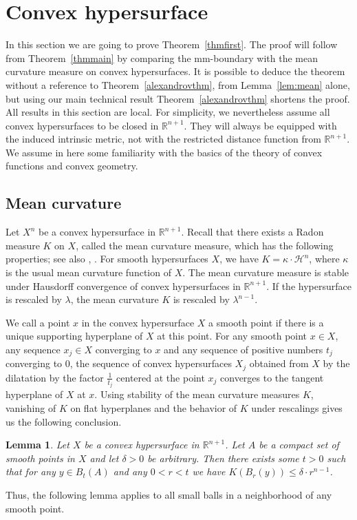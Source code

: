 \documentclass[12pt,leqno,intlimits]{amsart}
\numberwithin{equation}{section}
\newtheorem{lem}[thm]{Lemma}
\theoremstyle{definition}
\theoremstyle{remark}
\newcommand{\tref}[1]{Theorem~\ref{#1}}
\newcommand{\lref}[1]{Lemma~\ref{#1}}
\newcommand{\R}{\mathbb{R}}
\begin{document}
\section{Convex hypersurface} \label{sec:hyper}
In this section we are going to prove \tref{thmfirst}. The proof will follow from \tref{thmmain} by comparing the mm-boundary with the mean curvature measure on convex hypersurfaces.
It is possible  to deduce the theorem without a reference to \tref{alexandrovthm}, from \lref{lem:mean} alone, but using  our main technical result \tref{alexandrovthm}
shortens the proof.   All results in this section are local. For simplicity, we nevertheless assume all convex hypersurfaces to be closed in $\R^{n+1}$. They will always be equipped with the induced intrinsic metric, not with the restricted distance function from $\mathbb R^{n+1}$.
We assume in here some familiarity with the  basics of the theory of convex functions and convex geometry.
\subsection{Mean curvature}
Let $X^n$ be a  convex hypersurface in $\R ^{n+1}$.  Recall that there exists a Radon measure $K$ on $X$, called the mean curvature measure, which has the following properties; see also \cite{Schneider}, \cite{Fedcurvature}.
For smooth hypersurfaces $X$,  we have $K=\kappa \cdot \mathcal H^n$, where $\kappa$ is the  usual mean curvature function of $X$.
   The mean curvature measure is stable under Hausdorff convergence of convex hypersurfaces in $\R^{n+1}$. If the hypersurface is rescaled by $\lambda$, the mean curvature $K$ is rescaled by $\lambda ^{n-1}$.

We call a point $x$ in the convex hypersurface $X$ a smooth point if there is a unique supporting hyperplane of $X$ at this point.
For  any smooth point $x\in X$, any sequence $x_j\in X$  converging to $x$ and any sequence of positive numbers $t_j$ converging to $0$, the
sequence of convex hypersurfaces  $X_j$ obtained from $X$ by the  dilatation by the factor $\frac 1 {t_j}$ centered at the point $x_j$ converges
to the tangent hyperplane of $X$ at $x$. Using   stability of the mean curvature measures  $K$, vanishing of $K$ on   flat hyperplanes and
 the behavior of $K$ under rescalings gives us the following conclusion.
\begin{lem} \label{lem:compsm}
Let $X$ be a convex hypersurface in $\R^{n+1}$. Let $A$ be a compact set of smooth points in $X$ and let $\delta >0$ be arbitrary.
Then there exists some $t>0$ such that for any  $y\in B_{t} (A)$ and any $0<r<t$ we have $K(B_r(y))  \leq \delta \cdot r^{n-1}$.
\end{lem}
 Thus, the following lemma applies to all small balls in a neighborhood of any smooth point.
\end{document}
